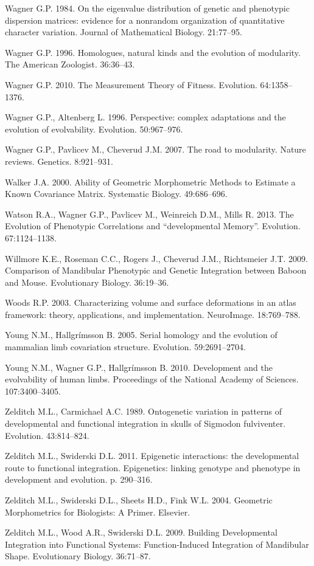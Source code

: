 \documentclass[12pt,]{article}
\begin{document}
Wagner G.P. 1984. On the eigenvalue distribution of genetic and
phenotypic dispersion matrices: evidence for a nonrandom organization of
quantitative character variation. Journal of Mathematical Biology.
21:77--95.

Wagner G.P. 1996. Homologues, natural kinds and the evolution of
modularity. The American Zoologist. 36:36--43.

Wagner G.P. 2010. The Measurement Theory of Fitness. Evolution.
64:1358--1376.

Wagner G.P., Altenberg L. 1996. Perspective: complex adaptations and the
evolution of evolvability. Evolution. 50:967--976.

Wagner G.P., Pavlicev M., Cheverud J.M. 2007. The road to modularity.
Nature reviews. Genetics. 8:921--931.

Walker J.A. 2000. Ability of Geometric Morphometric Methods to Estimate
a Known Covariance Matrix. Systematic Biology. 49:686--696.

Watson R.A., Wagner G.P., Pavlicev M., Weinreich D.M., Mills R. 2013.
The Evolution of Phenotypic Correlations and ``developmental Memory''.
Evolution. 67:1124--1138.

Willmore K.E., Roseman C.C., Rogers J., Cheverud J.M., Richtsmeier J.T.
2009. Comparison of Mandibular Phenotypic and Genetic Integration
between Baboon and Mouse. Evolutionary Biology. 36:19--36.

Woods R.P. 2003. Characterizing volume and surface deformations in an
atlas framework: theory, applications, and implementation. NeuroImage.
18:769--788.

Young N.M., Hallgrímsson B. 2005. Serial homology and the evolution of
mammalian limb covariation structure. Evolution. 59:2691--2704.

Young N.M., Wagner G.P., Hallgrímsson B. 2010. Development and the
evolvability of human limbs. Proceedings of the National Academy of
Sciences. 107:3400--3405.

Zelditch M.L., Carmichael A.C. 1989. Ontogenetic variation in patterns
of developmental and functional integration in skulls of Sigmodon
fulviventer. Evolution. 43:814--824.

Zelditch M.L., Swiderski D.L. 2011. Epigenetic interactions: the
developmental route to functional integration. Epigenetics: linking
genotype and phenotype in development and evolution. p. 290--316.

Zelditch M.L., Swiderski D.L., Sheets H.D., Fink W.L. 2004. Geometric
Morphometrics for Biologists: A Primer. Elsevier.

Zelditch M.L., Wood A.R., Swiderski D.L. 2009. Building Developmental
Integration into Functional Systems: Function-Induced Integration of
Mandibular Shape. Evolutionary Biology. 36:71--87.
\end{document}
